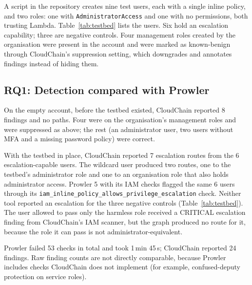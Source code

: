 \documentclass[conference]{IEEEtran}
\begin{document}
A script in the repository creates nine test users, each with a single inline policy, and two roles: one with \texttt{AdministratorAccess} and one with no permissions, both trusting Lambda. Table~\ref{tab:testbed} lists the users. Six hold an escalation capability; three are negative controls. Four management roles created by the organisation were present in the account and were marked as known-benign through CloudChain's suppression setting, which downgrades and annotates findings instead of hiding them.

\subsection{RQ1: Detection compared with Prowler}
On the empty account, before the testbed existed, CloudChain reported 8 findings and no paths. Four were on the organisation's management roles and were suppressed as above; the rest (an administrator user, two users without MFA and a missing password policy) were correct.

With the testbed in place, CloudChain reported 7 escalation routes from the 6 escalation-capable users. The wildcard user produced two routes, one to the testbed's administrator role and one to an organisation role that also holds administrator access. Prowler 5 with its IAM checks flagged the same 6 users through its \texttt{iam\_inline\_policy\_allows\_\allowbreak privilege\_escalation} check. Neither tool reported an escalation for the three negative controls (Table~\ref{tab:testbed}). The user allowed to pass only the harmless role received a CRITICAL escalation finding from CloudChain's IAM scanner, but the graph produced no route for it, because the role it can pass is not administrator-equivalent.

Prowler failed 53 checks in total and took 1\,min 45\,s; CloudChain reported 24 findings. Raw finding counts are not directly comparable, because Prowler includes checks CloudChain does not implement (for example, confused-deputy protection on service roles).
\end{document}
